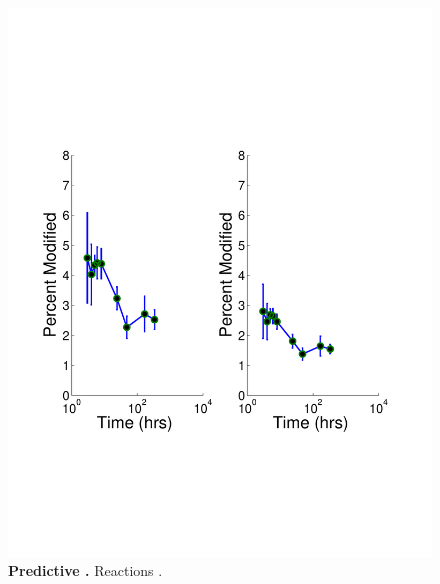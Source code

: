 \documentclass[12pt]{article}
\begin{document}
\clearpage
\begin{figure}[p]
\centerline{\includegraphics[width=5in]{Figures/Paper_Ecoli_Oxidations.pdf}}
\caption{\label{fig:nitrogen_network}\textbf{Predictive .} Reactions .}
\end{figure}
\end{document}
